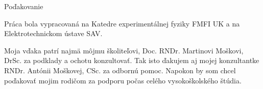\documentclass[
	11pt, %
]{beamer}
\begin{document}
\begin{frame}[plain] %
	\begin{center}
		{\Huge Poďakovanie}
		
		\bigskip\bigskip %
	\end{center}
Práca bola vypracovaná na Katedre experimentálnej fyziky FMFI UK a na Elektrotechnickom ústave SAV.

Moja vďaka patrí najmä môjmu školiteľovi, Doc. RNDr. Martinovi Moškovi, DrSc. za podklady a ochotu konzultovať.
Tak isto ďakujem aj mojej konzultantke RNDr. Antónii Moškovej, CSc. za odbornú pomoc. Napokon by som chcel poďakovať mojim rodičom
za podporu počas celého vysokoškolského štúdia.
\end{frame}
\end{document}

